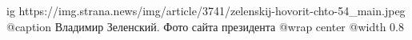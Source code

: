  
 
 
 
 

\ifcmt
  ig https://img.strana.news/img/article/3741/zelenskij-hovorit-chto-54_main.jpeg
  @caption Владимир Зеленский. Фото сайта президента
  @wrap center
  @width 0.8
\fi
